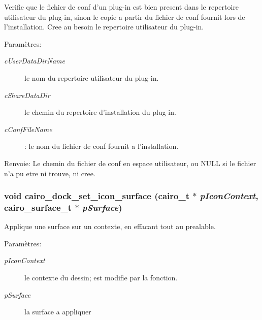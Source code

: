 Verifie que le fichier de conf d'un plug-in est bien present dans le repertoire utilisateur du plug-in, sinon le copie a partir du fichier de conf fournit lors de l'installation. Cree au besoin le repertoire utilisateur du plug-in. \begin{Desc}
\item[Param\`{e}tres:]
\begin{description}
\item[{\em c\-User\-Data\-Dir\-Name}]le nom du repertoire utilisateur du plug-in. \item[{\em c\-Share\-Data\-Dir}]le chemin du repertoire d'installation du plug-in. \item[{\em c\-Conf\-File\-Name}]: le nom du fichier de conf fournit a l'installation. \end{description}
\end{Desc}
\begin{Desc}
\item[Renvoie:]Le chemin du fichier de conf en espace utilisateur, ou NULL si le fichier n'a pu etre ni trouve, ni cree. \end{Desc}
\subsubsection{\setlength{\rightskip}{0pt plus 5cm}void cairo\_\-dock\_\-set\_\-icon\_\-surface (cairo\_\-t $\ast$ {\em p\-Icon\-Context}, cairo\_\-surface\_\-t $\ast$ {\em p\-Surface})}\label{cairo-dock-applet-factory_8c_f298aaa4399caa2ce52f2e775eeb1c97}


Applique une surface sur un contexte, en effacant tout au prealable. \begin{Desc}
\item[Param\`{e}tres:]
\begin{description}
\item[{\em p\-Icon\-Context}]le contexte du dessin; est modifie par la fonction. \item[{\em p\-Surface}]la surface a appliquer \end{description}
\end{Desc}
